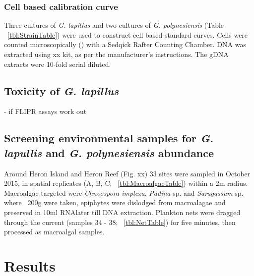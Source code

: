 \documentclass[12pt]{article}
\begin{document}
\subsubsection{Cell based calibration curve}
Three cultures of \emph{G. lapillus} and two cultures of \emph{G. polynesiensis} (Table ~\ref{tbl:StrainTable}) were used to construct cell based standard curves. Cells were counted microscopically () with a Sedqick Rafter Counting Chamber. DNA was extracted using xx kit, as per the manufacturer's instructions. The gDNA extracts were 10-fold serial diluted.
\subsection{Toxicity of \emph{G. lapillus}}
- if FLIPR assays work out
\subsection{Screening environmental samples for \emph{G. lapullis} and \emph{G. polynesiensis} abundance}
Around Heron Island and Heron Reef (Fig. xx) 33 sites were sampled in October 2015, in spatial replicates (A, B, C; ~\ref{tbl:MacroalgaeTable}) within a 2m radius. Macroalgae targeted were \textit{Chnoospora implexa}, \textit{Padina} sp. and \textit{Saragassum} sp. where ~200g were taken, epiphytes were dislodged from macroalagae and preserved in 10ml RNAlater till DNA extraction.
Plankton nets were dragged through the current (samples 34 - 38; ~\ref{tbl:NetTable}) for five minutes, then processed as macroalgal samples.

\newpage
\section{Results}
\end{document}
